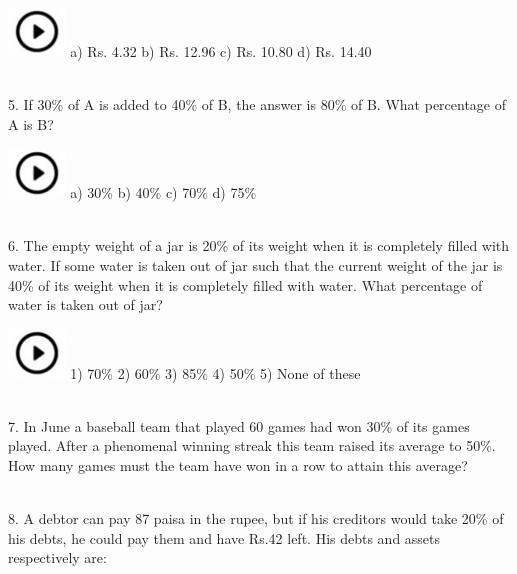 \documentclass{article}
\begin{document}
\noindent    \includegraphics*[width=0.60in, height=0.52in]{images/image1} a) Rs. 4.32                   b) Rs. 12.96          c) Rs. 10.80          d) Rs. 14.40

\noindent 

\noindent 

\noindent 

\noindent \\
5.   If 30\% of A is added to 40\% of B, the answer is 80\% of B. What percentage of A is B?

\noindent \includegraphics*[width=0.60in, height=0.52in]{images/image1} a) 30\%                    b) 40\%              c) 70\%              d) 75\%

\noindent 

\noindent \\
 6.   The empty weight of a jar is 20\% of its weight when it is completely filled with water. If some water is taken out of jar such that the current weight of the jar is 40\% of its weight when it is completely filled with water. What percentage of water is taken out of jar?

\noindent 

\noindent   \includegraphics*[width=0.60in, height=0.52in]{images/image1} 1) 70\%                    2) 60\%              3) 85\%              4) 50\%              5) None of these

\noindent 

\noindent 

\noindent \\
 7.   In June a baseball team that played 60 games had won 30\% of its games played. After a
phenomenal winning streak this team raised its average to 50\%. How many games must the team have won in a row to attain this average?

\noindent \\
8.   A debtor can pay 87 paisa in the rupee, but if his creditors would take 20\% of his debts, he could pay them and have Rs.42 left. His debts and assets respectively are:
\end{document}
